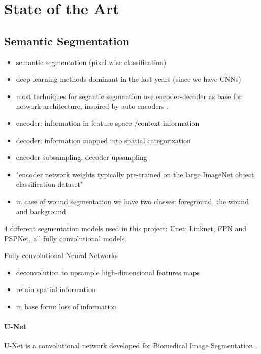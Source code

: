 \section{State of the Art}

\subsection{Semantic Segmentation}

\begin{itemize}
	\item semantic segmentation (pixel-wise classification)
	\item deep learning methods dominant in the last years (since we have CNNs)
	\item most techniques for segantic segmantion use encoder-decoder as base for network architecture, inspired by auto-encoders \cite{linknet}.
	\item encoder: information in feature space /context information \cite{linknet, MO2022626}
	\item decoder: information mapped into spatial categorization \cite{linknet, MO2022626}
	\item encoder subsampling, decoder upsampling \cite{Norelyaqine2023}
	\item "encoder network weights typically pre-trained on the large ImageNet object classification dataset" \cite{SegNet}
	\item in case of wound segmentation we have two classes: foreground, the wound and background
\end{itemize}

4 different segmentation models used in this project: Unet, Linknet, FPN and PSPNet, all fully convolutional models.

Fully convolutional Neural Networks
\begin{itemize}
	\item deconvolution to upsample high-dimensional features maps \cite{Norelyaqine2023}
	\item retain spatial information
	\item in base form: loss of information
\end{itemize}

\paragraph{U-Net}

U-Net is a convolutional network developed for Biomedical Image Segmentation \cite{unet}. 

